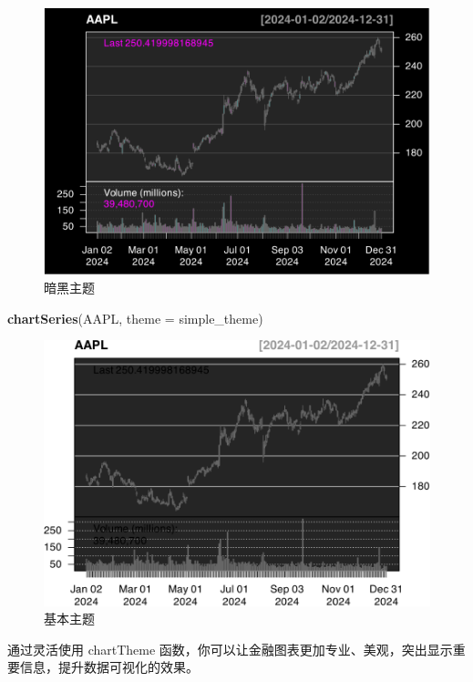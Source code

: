 \documentclass[]{ctexbook}
\newenvironment{Shaded}{\begin{snugshade}}{\end{snugshade}}
\newcommand{\AttributeTok}[1]{\textcolor[rgb]{0.13,0.29,0.53}{#1}}
\newcommand{\FunctionTok}[1]{\textcolor[rgb]{0.13,0.29,0.53}{\textbf{#1}}}
\newcommand{\NormalTok}[1]{#1}
\begin{document}
\begin{figure}
\includegraphics[width=0.9\linewidth]{QuantmodHandbook_files/figure-latex/createtheme-1} \caption{暗黑主题}\label{fig:createtheme}
\end{figure}

\begin{Shaded}
\begin{Highlighting}[]
\FunctionTok{chartSeries}\NormalTok{(AAPL, }\AttributeTok{theme =}\NormalTok{ simple\_theme)}
\end{Highlighting}
\end{Shaded}

\begin{figure}
\includegraphics[width=0.9\linewidth]{QuantmodHandbook_files/figure-latex/simpleTheme-1} \caption{基本主题}\label{fig:simpleTheme}
\end{figure}

通过灵活使用 chartTheme 函数，你可以让金融图表更加专业、美观，突出显示重要信息，提升数据可视化的效果。
\end{document}
